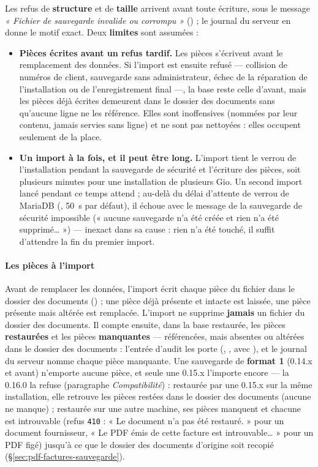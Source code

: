 \documentclass[a4paper,11pt,oneside]{article}
\begin{document}
Les refus de \textbf{structure} et de \textbf{taille} arrivent avant toute écriture, sous le message \emph{« Fichier de sauvegarde invalide ou corrompu »} () ; le journal du serveur en donne le motif exact. Deux \textbf{limites} sont assumées :
\begin{itemize}
    \item \textbf{Pièces écrites avant un refus tardif.} Les pièces s'écrivent avant le remplacement des données. Si l'import est ensuite refusé --- collision de numéros de client, sauvegarde sans administrateur, échec de la réparation de l'installation ou de l'enregistrement final ---, la base reste celle d'avant, mais les pièces déjà écrites demeurent dans le dossier des documents sans qu'aucune ligne ne les référence. Elles sont inoffensives (nommées par leur contenu, jamais servies sans ligne) et ne sont pas nettoyées : elles occupent seulement de la place.
    \item \textbf{Un import à la fois, et il peut être long.} L'import tient le verrou de l'installation pendant la sauvegarde de sécurité et l'écriture des pièces, soit plusieurs minutes pour une installation de plusieurs Gio. Un second import lancé pendant ce temps attend ; au-delà du délai d'attente de verrou de MariaDB (, 50~s par défaut), il échoue avec le message de la sauvegarde de sécurité impossible (« aucune sauvegarde n'a été créée et rien n'a été supprimé… ») --- inexact dans sa cause : rien n'a été touché, il suffit d'attendre la fin du premier import.
\end{itemize}

\paragraph{Les pièces à l'import}

Avant de remplacer les données, l'import écrit chaque pièce du fichier dans le dossier des documents () ; une pièce déjà présente et intacte est laissée, une pièce présente mais altérée est remplacée. L'import ne supprime \textbf{jamais} un fichier du dossier des documents. Il compte ensuite, dans la base restaurée, les pièces \textbf{restaurées} et les pièces \textbf{manquantes} --- référencées, mais absentes ou altérées dans le dossier des documents : l'entrée d'audit  les porte (, , avec ), et le journal du serveur nomme chaque pièce manquante. Une sauvegarde de \textbf{format 1} (0.14.x et avant) n'emporte aucune pièce, et seule une 0.15.x l'importe encore --- la 0.16.0 la refuse (paragraphe \emph{Compatibilité}) : restaurée par une 0.15.x sur la même installation, elle retrouve les pièces restées dans le dossier des documents (aucune ne manque) ; restaurée sur une autre machine, ses pièces manquent et chacune est introuvable (refus \texttt{410} : « Le document n'a pas été restauré. » pour un document fournisseur, « Le PDF émis de cette facture est introuvable… » pour un PDF figé) jusqu'à ce que le dossier des documents d'origine soit recopié (\S\ref{sec:pdf-factures-sauvegarde}).
\end{document}
